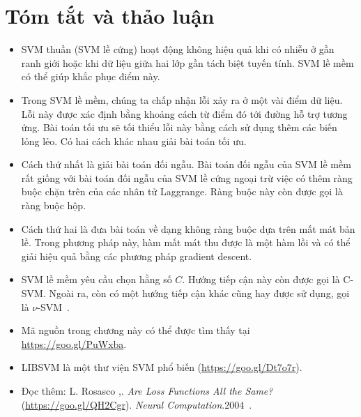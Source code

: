 \section{Tóm tắt và thảo luận }
\begin{itemize}
    \item SVM thuần (SVM lề cứng) hoạt động không hiệu quả khi có nhiễu
    ở gần ranh giới hoặc khi dữ liệu giữa hai lớp gần tách biệt tuyến tính. SVM lề mềm có thể giúp khắc phục điểm này.  
     
    \item Trong SVM lề mềm, chúng ta chấp nhận lỗi xảy ra ở
    một
    vài điểm dữ liệu. Lỗi này được xác định bằng khoảng cách từ điểm đó tới
    đường hỗ trợ tương ứng. Bài toán tối ưu sẽ tối thiểu lỗi này bằng
    cách sử dụng thêm các biến lỏng lẻo. Có hai cách khác nhau giải bài toán tối ưu. 
     
    \item Cách thứ nhất là giải bài toán đối ngẫu. Bài toán đối ngẫu của
    SVM lề mềm rất giống với bài toán đối ngẫu của SVM lề cứng ngoại trừ việc có thêm ràng buộc chặn trên của các nhân tử Laggrange. Ràng buộc này còn được gọi là ràng buộc hộp. 
     
    \item Cách thứ hai là đưa bài toán về dạng không ràng buộc dựa trên mất mát bản lề. Trong phương pháp này, hàm mất mát thu được là một
    hàm lồi và có thể giải hiệu quả bằng các phương pháp gradient    descent.  
     
    \item SVM lề mềm yêu cầu chọn hằng số $C$. Hướng tiếp cận này còn được gọi là C-SVM. Ngoài ra, còn có một hướng tiếp cận khác cũng hay được sử dụng, gọi là
    $\nu$-SVM~\cite{scholkopf2000new}. 
     
    \item Mã nguồn trong chương này có thể được tìm thấy tại
    \url{https://goo.gl/PuWxba}. 
    
    \item LIBSVM là một thư viện SVM phổ biến  (\url{https://goo.gl/Dt7o7r}).
     
    \item {Đọc thêm:} L. Rosasco \etal,.
    {\textit{Are Loss
        Functions All the Same?}} (\url{https://goo.gl/QH2Cgr}). \textit{Neural
    Computation}.2004~\cite{rosasco2004loss}.
 \end{itemize} 
